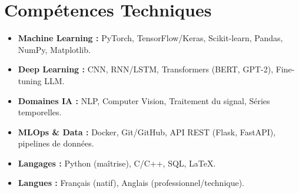 \documentclass[a4paper,11pt]{article}
\begin{document}
\section{Compétences Techniques}
\begin{itemize}[leftmargin=*, nosep]
    \item \small{\textbf{Machine Learning :} PyTorch, TensorFlow/Keras, Scikit-learn, Pandas, NumPy, Matplotlib.}
    \item \small{\textbf{Deep Learning :} CNN, RNN/LSTM, Transformers (BERT, GPT-2), Fine-tuning LLM.}
    \item \small{\textbf{Domaines IA :} NLP, Computer Vision, Traitement du signal, Séries temporelles.}
    \item \small{\textbf{MLOps \& Data :} Docker, Git/GitHub, API REST (Flask, FastAPI), pipelines de données.}
    \item \small{\textbf{Langages :} Python (maîtrise), C/C++, SQL, LaTeX.}
    \item \small{\textbf{Langues :} Français (natif), Anglais (professionnel/technique).}
\end{itemize}

\end{document}
